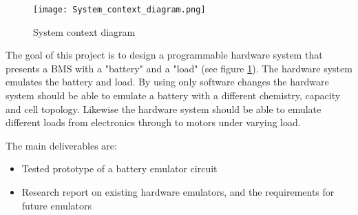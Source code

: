 \begin{figure}[ht]
    \centering
    \texttt{[image: System\_context\_diagram.png]}
    \caption{System context diagram}
    \label{fig:system_context_diagram}
\end{figure}

The goal of this project is to design a programmable hardware system that presents a BMS with a "battery" and a "load" (see figure \ref{fig:system_context_diagram}). The hardware system emulates the battery and load. By using only software changes the hardware system should be able to emulate a battery with a different chemistry, capacity and cell topology. Likewise the hardware system should be able to emulate different loads from electronics through to motors under varying load.



The main deliverables are:
\begin{itemize}
    \item Tested prototype of a battery emulator circuit
    \item Research report on existing hardware emulators, and the requirements for future emulators
\end{itemize}

